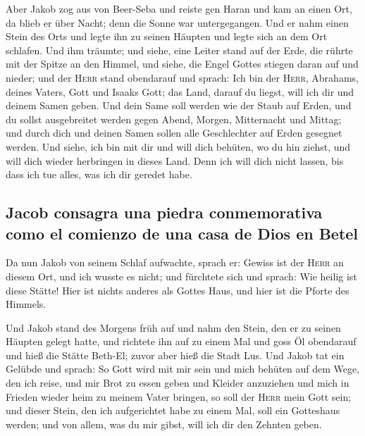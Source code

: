  Aber Jakob zog aus von Beer-Seba und reiste gen Haran
 und kam an einen Ort, da blieb er über Nacht; denn die
Sonne war untergegangen. Und er nahm einen Stein des Orts und legte ihn
zu seinen Häupten und legte sich an dem Ort schlafen. 
Und ihm träumte; und siehe, eine Leiter stand auf der Erde, die rührte
mit der Spitze an den Himmel, und siehe, die Engel Gottes stiegen daran
auf und nieder;  und der \textsc{Herr} stand obendarauf
und sprach: Ich bin der \textsc{Herr}, Abrahams, deines Vaters, Gott und
Isaaks Gott; das Land, darauf du liegst, will ich dir und deinem Samen
geben.  Und dein Same soll werden wie der Staub auf
Erden, und du sollst ausgebreitet werden gegen Abend, Morgen,
Mitternacht und Mittag; und durch dich und deinen Samen sollen alle
Geschlechter auf Erden gesegnet werden.  Und siehe, ich
bin mit dir und will dich behüten, wo du hin ziehst, und will dich
wieder herbringen in dieses Land. Denn ich will dich nicht lassen, bis
dass ich tue alles, was ich dir geredet habe.

\hypertarget{jacob-consagra-una-piedra-conmemorativa-como-el-comienzo-de-una-casa-de-dios-en-betel}{%
\subsection{Jacob consagra una piedra conmemorativa como el comienzo de
una casa de Dios en
Betel}\label{jacob-consagra-una-piedra-conmemorativa-como-el-comienzo-de-una-casa-de-dios-en-betel}}

 Da nun Jakob von seinem Schlaf aufwachte, sprach er:
Gewiss ist der \textsc{Herr} an diesem Ort, und ich wusste es nicht;
 und fürchtete sich und sprach: Wie heilig ist diese
Stätte! Hier ist nichts anderes als Gottes Haus, und hier ist die Pforte
des Himmels.

 Und Jakob stand des Morgens früh auf und nahm den Stein,
den er zu seinen Häupten gelegt hatte, und richtete ihn auf zu einem Mal
und goss Öl obendarauf  und hieß die Stätte Beth-El;
zuvor aber hieß die Stadt Lus.  Und Jakob tat ein Gelübde
und sprach: So Gott wird mit mir sein und mich behüten auf dem Wege, den
ich reise, und mir Brot zu essen geben und Kleider anzuziehen
 und mich in Frieden wieder heim zu meinem Vater bringen,
so soll der \textsc{Herr} mein Gott sein;  und dieser
Stein, den ich aufgerichtet habe zu einem Mal, soll ein Gotteshaus
werden; und von allem, was du mir gibst, will ich dir den Zehnten geben.

